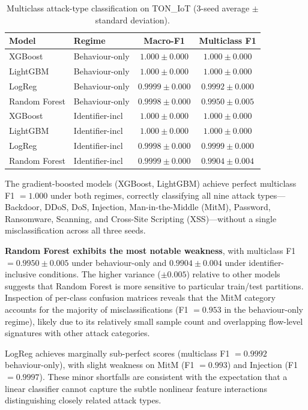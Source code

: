 \documentclass[12pt,a4paper]{report}
\begin{document}
\begin{table}[H]
\centering
\caption{Multiclass attack-type classification on TON\_IoT (3-seed average $\pm$ standard deviation).}
\label{tab:multiclass}
\begin{tabular}{llcc}
\toprule
\textbf{Model} & \textbf{Regime} & \textbf{Macro-F1} & \textbf{Multiclass F1} \\
\midrule
XGBoost & Behaviour-only & $1.000 \pm 0.000$ & $1.000 \pm 0.000$ \\
LightGBM & Behaviour-only & $1.000 \pm 0.000$ & $1.000 \pm 0.000$ \\
LogReg & Behaviour-only & $0.9999 \pm 0.000$ & $0.9992 \pm 0.000$ \\
Random Forest & Behaviour-only & $0.9998 \pm 0.000$ & $0.9950 \pm 0.005$ \\
\midrule
XGBoost & Identifier-incl & $1.000 \pm 0.000$ & $1.000 \pm 0.000$ \\
LightGBM & Identifier-incl & $1.000 \pm 0.000$ & $1.000 \pm 0.000$ \\
LogReg & Identifier-incl & $0.9998 \pm 0.000$ & $0.9999 \pm 0.000$ \\
Random Forest & Identifier-incl & $0.9999 \pm 0.000$ & $0.9904 \pm 0.004$ \\
\bottomrule
\end{tabular}
\end{table}

The gradient-boosted models (XGBoost, LightGBM) achieve perfect multiclass F1 $= 1.000$ under both regimes, correctly classifying all nine attack types---Backdoor, DDoS, DoS, Injection, Man-in-the-Middle (MitM), Password, Ransomware, Scanning, and Cross-Site Scripting (XSS)---without a single misclassification across all three seeds.

\textbf{Random Forest exhibits the most notable weakness}, with multiclass F1 $= 0.9950 \pm 0.005$ under behaviour-only and $0.9904 \pm 0.004$ under identifier-inclusive conditions. The higher variance ($\pm 0.005$) relative to other models suggests that Random Forest is more sensitive to particular train/test partitions. Inspection of per-class confusion matrices reveals that the MitM category accounts for the majority of misclassifications (F1 $= 0.953$ in the behaviour-only regime), likely due to its relatively small sample count and overlapping flow-level signatures with other attack categories.

LogReg achieves marginally sub-perfect scores (multiclass F1 $= 0.9992$ behaviour-only), with slight weakness on MitM (F1 $= 0.993$) and Injection (F1 $= 0.9997$). These minor shortfalls are consistent with the expectation that a linear classifier cannot capture the subtle nonlinear feature interactions distinguishing closely related attack types.
\end{document}
